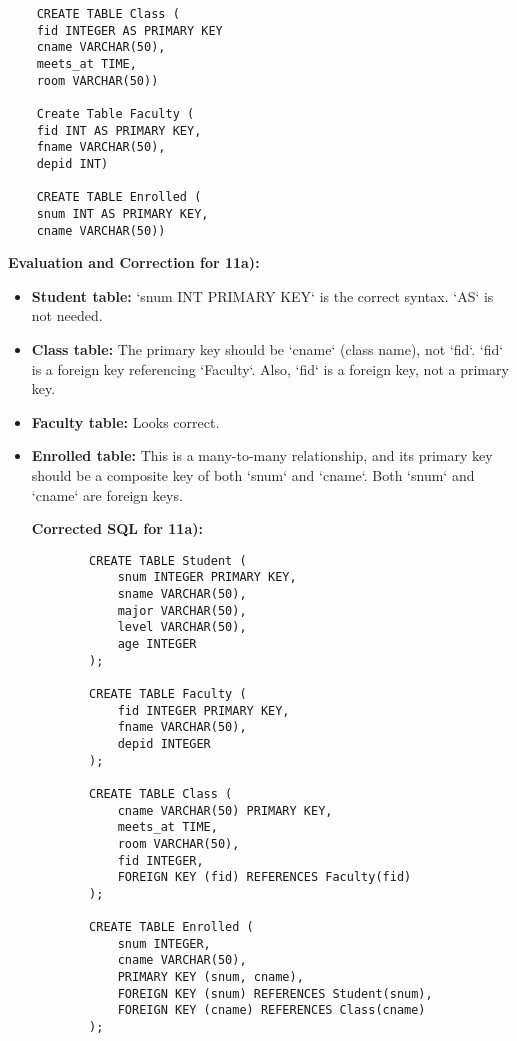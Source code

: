 \documentclass{article}
\begin{document}
\begin{enumerate}[label=\textbf{Question \arabic*.}]
\begin{lstlisting}
    CREATE TABLE Class (
    fid INTEGER AS PRIMARY KEY
    cname VARCHAR(50),
    meets_at TIME,
    room VARCHAR(50))

    Create Table Faculty (
    fid INT AS PRIMARY KEY,
    fname VARCHAR(50),
    depid INT)

    CREATE TABLE Enrolled (
    snum INT AS PRIMARY KEY,
    cname VARCHAR(50))
    \end{lstlisting}
    \textbf{Evaluation and Correction for 11a):}
    \begin{itemize}
        \item \textbf{Student table:} `snum INT PRIMARY KEY` is the correct syntax. `AS` is not needed.
        \item \textbf{Class table:} The primary key should be `cname` (class name), not `fid`. `fid` is a foreign key referencing `Faculty`. Also, `fid` is a foreign key, not a primary key.
        \item \textbf{Faculty table:} Looks correct.
        \item \textbf{Enrolled table:} This is a many-to-many relationship, and its primary key should be a composite key of both `snum` and `cname`. Both `snum` and `cname` are foreign keys.

        \textbf{Corrected SQL for 11a):}
        \begin{lstlisting}
        CREATE TABLE Student (
            snum INTEGER PRIMARY KEY,
            sname VARCHAR(50),
            major VARCHAR(50),
            level VARCHAR(50),
            age INTEGER
        );

        CREATE TABLE Faculty (
            fid INTEGER PRIMARY KEY,
            fname VARCHAR(50),
            depid INTEGER
        );

        CREATE TABLE Class (
            cname VARCHAR(50) PRIMARY KEY,
            meets_at TIME,
            room VARCHAR(50),
            fid INTEGER,
            FOREIGN KEY (fid) REFERENCES Faculty(fid)
        );

        CREATE TABLE Enrolled (
            snum INTEGER,
            cname VARCHAR(50),
            PRIMARY KEY (snum, cname),
            FOREIGN KEY (snum) REFERENCES Student(snum),
            FOREIGN KEY (cname) REFERENCES Class(cname)
        );
        \end{lstlisting}
    \end{itemize}


\end{enumerate}
\end{document}
